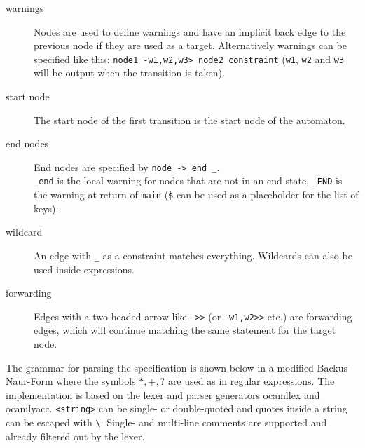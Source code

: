 \begin{description}
\item[warnings]
Nodes are used to define warnings and have an implicit back edge to the previous node if they are used as a target.
Alternatively warnings can be specified like this: \verb|node1 -w1,w2,w3> node2 constraint| (\verb|w1|, \verb|w2| and \verb|w3| will be output when the transition is taken).

\item[start node]
The start node of the first transition is the start node of the automaton.

\item[end nodes]
End nodes are specified by \verb|node -> end _|.\\
\verb|_end| is the local warning for nodes that are not in an end state, \verb|_END| is the warning at return of \verb|main| (\verb|$| can be used as a placeholder for the list of keys).

\item[wildcard]
An edge with \verb|_| as a constraint matches everything. Wildcards can also be used inside expressions.

\item[forwarding]
Edges with a two-headed arrow like \verb|->>| (or \verb|-w1,w2>>| etc.) are forwarding edges, which will continue matching the same statement for the target node.\\
\end{description}
The grammar for parsing the specification is shown below in a modified Backus-Naur-Form where the symbols $*, +, ?$ are used as in regular expressions. The implementation is based on the lexer and parser generators ocamllex and ocamlyacc. \verb|<string>| can be single- or double-quoted and quotes inside a string can be escaped with \verb|\|. Single- and multi-line comments are supported and already filtered out by the lexer.
